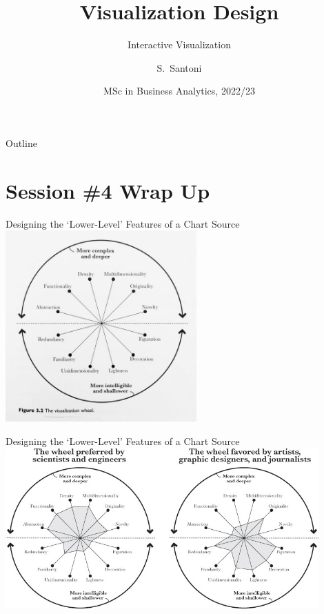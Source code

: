 \documentclass[notes, aspectratio=1610]{beamer}
\title[Visualization Design]%
{Visualization Design}
\subtitle{Interactive Visualization}
\author{S.~Santoni\inst{1}\inst{2}}
\institute{
	\inst{1}%
	Bayes Business School
	\and
	\inst{2}%
	Soundcloud
	}
\date{MSc in Business Analytics, 2022/23}
\begin{document}
\begin{frame}
	\titlepage
\end{frame}

\begin{frame}{Outline}
	\tableofcontents
\end{frame}

\section{Session \#4 Wrap Up}

\begin{frame}{Designing the `Lower-Level' Features of a Chart}
	{Source \cite[][page 61]{cairo2012}}
	\centering 
	\includegraphics[width=0.55\textwidth]{images/viz_wheel.jpeg}
\end{frame}

\begin{frame}{Designing the `Lower-Level' Features of a Chart}
	{Source \cite[][page 63]{cairo2012}}
	\centering 
	\includegraphics[width=0.9\textwidth]{images/viz_whell_comparison.jpeg}
\end{frame}
\end{document}
